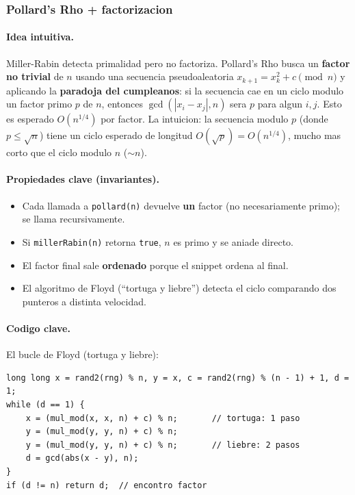 ﻿\subsubsection{Pollard's Rho + factorizacion}

\paragraph{Idea intuitiva.}
Miller-Rabin detecta primalidad pero no factoriza. Pollard's Rho busca un \textbf{factor no trivial} de $n$ usando una secuencia pseudoaleatoria $x_{k+1} = x_k^2 + c \pmod n$ y aplicando la \textbf{paradoja del cumpleanos}: si la secuencia cae en un ciclo modulo un factor primo $p$ de $n$, entonces $\gcd(|x_i - x_j|, n)$ sera $p$ para algun $i, j$. Esto es esperado $O(n^{1/4})$ por factor. La intuicion: la secuencia modulo $p$ (donde $p \le \sqrt{n}$) tiene un ciclo esperado de longitud $O(\sqrt{p}) = O(n^{1/4})$, mucho mas corto que el ciclo modulo $n$ ($\sim n$).

\paragraph{Propiedades clave (invariantes).}
\begin{itemize}\setlength\itemsep{0pt}
	\item Cada llamada a \texttt{pollard(n)} devuelve \textbf{un} factor (no necesariamente primo); se llama recursivamente.
	\item Si \texttt{millerRabin(n)} retorna \texttt{true}, $n$ es primo y se aniade directo.
	\item El factor final sale \textbf{ordenado} porque el snippet ordena al final.
	\item El algoritmo de Floyd (``tortuga y liebre'') detecta el ciclo comparando dos punteros a distinta velocidad.
\end{itemize}

\paragraph{Codigo clave.}
El bucle de Floyd (tortuga y liebre):
\begin{verbatim}
long long x = rand2(rng) % n, y = x, c = rand2(rng) % (n - 1) + 1, d = 1;
while (d == 1) {
    x = (mul_mod(x, x, n) + c) % n;       // tortuga: 1 paso
    y = (mul_mod(y, y, n) + c) % n;
    y = (mul_mod(y, y, n) + c) % n;       // liebre: 2 pasos
    d = gcd(abs(x - y), n);
}
if (d != n) return d;  // encontro factor
\end{verbatim}

